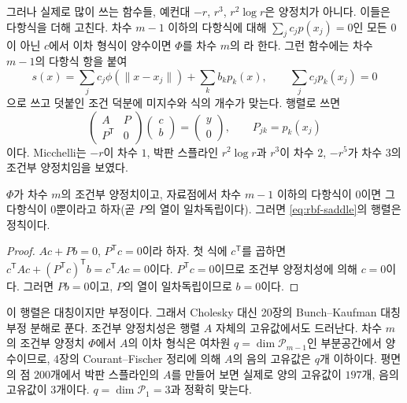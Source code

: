 그러나 실제로 많이 쓰는 함수들, 예컨대 $-r$, $r^3$, $r^2\log r$은 양정치가 아니다. 이들은 다항식을 더해 고친다. 차수 $m-1$ 이하의 다항식에 대해 $\sum_jc_jp(x_j)=0$인 모든 $0$이 아닌 $c$에서 이차 형식이 양수이면 $\Phi$를 차수 $m$의 라 한다. 그런 함수에는 차수 $m-1$의 다항식 항을 붙여
\[
s(x)=\sum_jc_j\phi(\|x-x_j\|)+\sum_kb_kp_k(x),\qquad\sum_jc_jp_k(x_j)=0
\]
으로 쓰고 덧붙인 조건 덕분에 미지수와 식의 개수가 맞는다. 행렬로 쓰면
\begin{equation}
\label{eq:rbf-saddle}
\begin{pmatrix}A&P\\P^{\mathsf T}&0\end{pmatrix}\begin{pmatrix}c\\b\end{pmatrix}=\begin{pmatrix}y\\0\end{pmatrix},\qquad P_{jk}=p_k(x_j)
\end{equation}
이다. Micchelli는 $-r$이 차수 $1$, 박판 스플라인 $r^2\log r$과 $r^3$이 차수 $2$, $-r^5$가 차수 $3$의 조건부 양정치임을 보였다\cite{micchelli1986}.

\begin{proposition}
\label{prop:rbf-saddle}
$\Phi$가 차수 $m$의 조건부 양정치이고, 자료점에서 차수 $m-1$ 이하의 다항식이 $0$이면 그 다항식이 $0$뿐이라고 하자(곧 $P$의 열이 일차독립이다). 그러면 \eqref{eq:rbf-saddle}의 행렬은 정칙이다.
\end{proposition}

\begin{proof}
$Ac+Pb=0$, $P^{\mathsf T}c=0$이라 하자. 첫 식에 $c^{\mathsf T}$를 곱하면 $c^{\mathsf T}Ac+(P^{\mathsf T}c)^{\mathsf T}b=c^{\mathsf T}Ac=0$이다. $P^{\mathsf T}c=0$이므로 조건부 양정치성에 의해 $c=0$이다. 그러면 $Pb=0$이고, $P$의 열이 일차독립이므로 $b=0$이다.
\end{proof}

이 행렬은 대칭이지만 부정이다. 그래서 Cholesky 대신 20장의 Bunch--Kaufman 대칭 부정 분해로 푼다. 조건부 양정치성은 행렬 $A$ 자체의 고유값에서도 드러난다. 차수 $m$의 조건부 양정치 $\Phi$에서 $A$의 이차 형식은 여차원 $q=\dim\mathcal P_{m-1}$인 부분공간에서 양수이므로, 4장의 Courant--Fischer 정리에 의해 $A$의 음의 고유값은 $q$개 이하이다. 평면의 점 $200$개에서 박판 스플라인의 $A$를 만들어 보면 실제로 양의 고유값이 $197$개, 음의 고유값이 $3$개이다. $q=\dim\mathcal P_1=3$과 정확히 맞는다.

